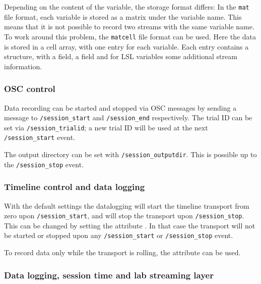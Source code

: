 
Depending on the content of the  variable, the
storage format differs: In the \verb!mat! file format, each variable
is stored as a matrix under the variable name. This means that it is
not possible to record two streams with the same variable name. To
work around this problem, the \verb!matcell! file format can be
used. Here the data is stored in a cell array, with one entry for each
variable. Each entry contains a structure, with a  field,
a  field and for LSL variables some additional stream
information.

\subsubsection*{OSC control}

Data recording can be started and stopped via OSC messages by sending a
message to \verb!/session_start! and \verb!/session_end!
respectively. The trial ID can be set via \verb!/session_trialid!; a new
trial ID will be used at the next \verb!/session_start! event.

The output directory can be set with \verb!/session_outputdir!. This is
possible up to the \verb!/session_stop! event.




\subsubsection*{Timeline control and data logging}

With the default settings the datalogging will start the timeline
transport from zero upon \verb!/session_start!, and will stop the
transport upon \verb!/session_stop!. This can be changed by setting the
attribute . In that case the transport
will not be started or stopped upon any \verb!/session_start!
or \verb!/session_stop! event.

To record data only while the transport is rolling, the
attribute  can be used.

\subsubsection*{Data logging, session time and lab streaming layer}

